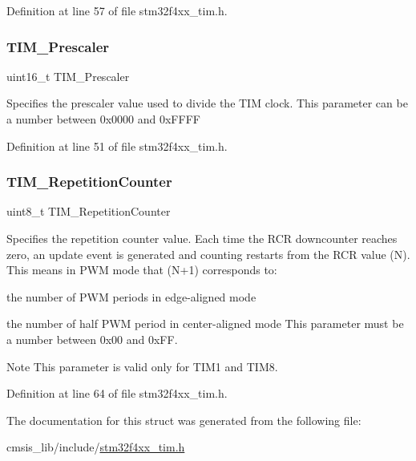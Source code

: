 Definition at line 57 of file stm32f4xx\+\_\+tim.\+h.

\mbox{\label{struct_t_i_m___time_base_init_type_def_a30c6857997a4ddd7d3d66fd3a8907c37}} 
\subsubsection{\texorpdfstring{T\+I\+M\+\_\+\+Prescaler}{TIM\_Prescaler}}
{\footnotesize\ttfamily uint16\+\_\+t T\+I\+M\+\_\+\+Prescaler}

Specifies the prescaler value used to divide the T\+IM clock. This parameter can be a number between 0x0000 and 0x\+F\+F\+FF 

Definition at line 51 of file stm32f4xx\+\_\+tim.\+h.

\mbox{\label{struct_t_i_m___time_base_init_type_def_a121b27ced71ccb2c85f1d9825ae8d496}} 
\subsubsection{\texorpdfstring{T\+I\+M\+\_\+\+Repetition\+Counter}{TIM\_RepetitionCounter}}
{\footnotesize\ttfamily uint8\+\_\+t T\+I\+M\+\_\+\+Repetition\+Counter}

Specifies the repetition counter value. Each time the R\+CR downcounter reaches zero, an update event is generated and counting restarts from the R\+CR value (N). This means in P\+WM mode that (N+1) corresponds to\+:
\begin{DoxyItemize}
\item the number of P\+WM periods in edge-\/aligned mode
\item the number of half P\+WM period in center-\/aligned mode This parameter must be a number between 0x00 and 0x\+FF. \begin{DoxyNote}{Note}
This parameter is valid only for T\+I\+M1 and T\+I\+M8. 
\end{DoxyNote}

\end{DoxyItemize}

Definition at line 64 of file stm32f4xx\+\_\+tim.\+h.



The documentation for this struct was generated from the following file\+:\begin{DoxyCompactItemize}
\item 
cmsis\+\_\+lib/include/\hyperlink{stm32f4xx__tim_8h}{stm32f4xx\+\_\+tim.\+h}\end{DoxyCompactItemize}
